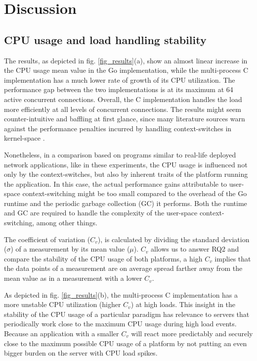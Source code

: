\section{Discussion}
\subsection{CPU usage and load handling stability}
The results, as depicted in fig. \ref{fig_results}(a), show an almost linear increase in the CPU usage mean value in the Go implementation, while the multi-process C implementation has a much lower rate of growth of its CPU utilization. The performance gap between the two implementations is at its maximum at 64 active concurrent connections. Overall, the C implementation handles the load more efficiently at all levels of concurrent connections. The results might seem counter-intuitive and baffling at first glance, since many literature sources warn against the performance penalties incurred by handling context-switches in kernel-space \cite{Cox-Buday2017}\cite{Kerrisk2010}. 

Nonetheless, in a comparison based on programs similar to real-life deployed network applications, like in these experiments, the CPU usage is influenced not only by the context-switches, but also by inherent traits of the platform running the application. In this case, the actual performance gains attributable to user-space context-switching might be too small compared to the overhead of the Go runtime and the periodic garbage collection (GC) it performs. Both the runtime and GC are required to handle the complexity of the user-space context-switching, among other things.

The coefficient of variation ($C_v$), is calculated by dividing the standard deviation ($\sigma$) of a measurement by its mean value ($\mu$). $C_v$ allows us to answer RQ2 and compare the stability of the CPU usage of both platforms, a high $C_v$ implies that the data points of a measurement are on average spread farther away from the mean value as in a measurement with a lower $C_v$. 

As depicted in fig. \ref{fig_results}(b), the multi-process C implementation has a more unstable CPU utilization (higher $C_v$) at high loads. This insight in the stability of the CPU usage of a particular paradigm has relevance to servers that periodically work close to the maximum CPU usage during high load events. Because an application with a smaller $C_v$ will react more predictably and securely close to the maximum possible CPU usage of a platform by not putting an even bigger burden on the server with CPU load spikes.

